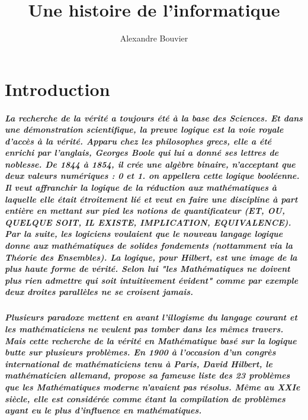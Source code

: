 \documentclass[a4paper, 11pt]{book}
\begin{document}
\title{Une histoire de l'informatique}
\author{Alexandre Bouvier}
\date{}

\mainmatter

\maketitle

\chapter*{ Introduction }


\paragraph{
  La recherche de la vérité a toujours été à la base des Sciences. Et dans une démonstration scientifique, la preuve logique est la voie royale d'accès à la vérité. Apparu chez les philosophes grecs, elle a été enrichi par l'anglais, Georges Boole qui lui a donné ses lettres de noblesse. De 1844 à 1854, il crée une algèbre binaire, n'acceptant que deux valeurs numériques : 0 et 1. on appellera cette logique booléenne. Il veut affranchir la logique de la réduction aux mathématiques à laquelle elle était étroitement lié et veut en faire une discipline à part entière en mettant sur pied les notions de quantificateur (ET, OU, QUELQUE SOIT, IL EXISTE, IMPLICATION, EQUIVALENCE). Par la suite, les logiciens voulaient que le nouveau langage logique donne aux mathématiques de solides fondements (nottamment via la Théorie des Ensembles). La logique, pour Hilbert, est une image de la plus haute forme de vérité. Selon lui "les Mathématiques ne doivent plus rien admettre  qui soit intuitivement évident" comme par exemple deux droites parallèles ne se croisent jamais.
}

\paragraph{
  Plusieurs paradoxe mettent en avant l'illogisme du langage courant et les mathématiciens ne veulent pas tomber dans les mêmes travers. Mais cette recherche de la vérité en Mathématique basé sur la logique butte sur plusieurs problèmes. En 1900 à l'occasion d'un congrès international de mathématiciens tenu à Paris, David Hilbert, le mathématicien allemand, propose sa fameuse liste des 23 problèmes que les Mathématiques moderne n'avaient pas résolus. Même au XXIe siècle, elle est considérée comme étant la compilation de problèmes ayant eu le plus d'influence en mathématiques.
}
\end{document}
